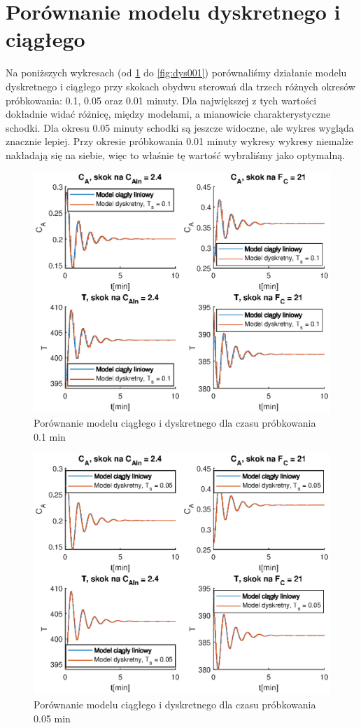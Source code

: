 \section{Porównanie modelu dyskretnego i ciągłego}
Na poniższych wykresach (od \ref{fig:dys01} do \ref{fig:dys001}) porównaliśmy działanie modelu dyskretnego i ciągłego przy skokach obydwu sterowań dla trzech różnych okresów próbkowania: 0.1, 0.05 oraz 0.01 minuty. Dla największej z tych wartości dokładnie widać różnicę, między modelami, a mianowicie charakterystyczne schodki. Dla okresu 0.05 minuty schodki są jeszcze widoczne, ale wykres wygląda znacznie lepiej. Przy okresie próbkowania 0.01 minuty wykresy wykresy niemalże nakładają się na siebie, więc to właśnie tę wartość wybraliśmy jako optymalną.
\begin{figure}
	\centering
	\includegraphics[width=.8\linewidth]{plot/dysk_1.eps}
	\caption{Porównanie modelu ciągłego i dyskretnego dla czasu próbkowania 0.1 min}
	\label{fig:dys01}
\end{figure}
\begin{figure}
\centering
\includegraphics[width=.8\linewidth]{plot/dysk_05.eps}
\caption{Porównanie modelu ciągłego i dyskretnego dla czasu próbkowania 0.05 min}
\label{fig:dys005}
\end{figure}
